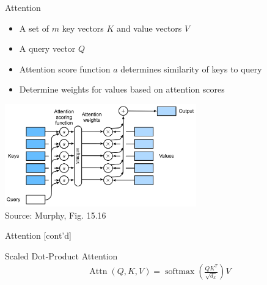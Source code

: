 \documentclass[ignorenonframetext,xcolor=x11names]{beamer}
\begin{document}
\begin{frame}{Attention}
\begin{itemize}
  \item A set of $m$ key vectors $K$ and value vectors $V$
  \item A query vector $Q$
  \item Attention score function $a$ determines similarity of keys to query
  \item Determine weights for values based on attention scores
\end{itemize}

\centering
\includegraphics[height=1.75in]{murphy_15_16.png} \\

\scriptsize Source: Murphy, Fig. 15.16 \normalsize
\end{frame}

\begin{frame}{Attention \small [cont'd]}
\begin{block}{Scaled Dot-Product Attention}
\begin{align*}
\operatorname{Attn}(Q, K, V) = \operatorname{softmax}\left(\frac{Q K^T}{\sqrt{d_k}} \right) V
\end{align*}
\end{block}

\end{frame}
\end{document}
